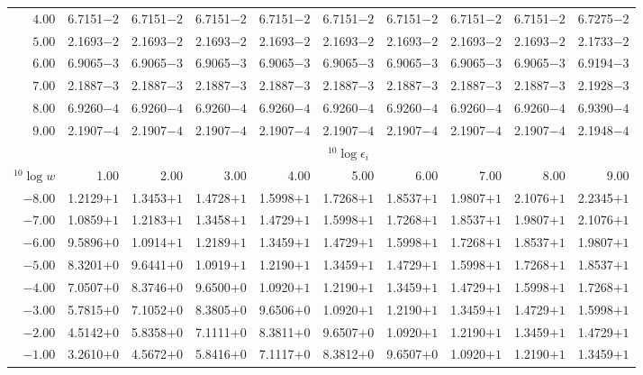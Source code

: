 \documentclass[useAMS,usenatbib]{mn2e}
\begin{document}
\begin{table}
\begin{tabular}{rrrrrrrrrr}
$ 4.00$ & 6.7151$-2$ & 6.7151$-2$ & 6.7151$-2$ & 6.7151$-2$ & 6.7151$-2$ & 6.7151$-2$ & 6.7151$-2$ & 6.7151$-2$ & 6.7275$-2$ \\
$ 5.00$ & 2.1693$-2$ & 2.1693$-2$ & 2.1693$-2$ & 2.1693$-2$ & 2.1693$-2$ & 2.1693$-2$ & 2.1693$-2$ & 2.1693$-2$ & 2.1733$-2$ \\
$ 6.00$ & 6.9065$-3$ & 6.9065$-3$ & 6.9065$-3$ & 6.9065$-3$ & 6.9065$-3$ & 6.9065$-3$ & 6.9065$-3$ & 6.9065$-3$ & 6.9194$-3$ \\
$ 7.00$ & 2.1887$-3$ & 2.1887$-3$ & 2.1887$-3$ & 2.1887$-3$ & 2.1887$-3$ & 2.1887$-3$ & 2.1887$-3$ & 2.1887$-3$ & 2.1928$-3$ \\
$ 8.00$ & 6.9260$-4$ & 6.9260$-4$ & 6.9260$-4$ & 6.9260$-4$ & 6.9260$-4$ & 6.9260$-4$ & 6.9260$-4$ & 6.9260$-4$ & 6.9390$-4$ \\
$ 9.00$ & 2.1907$-4$ & 2.1907$-4$ & 2.1907$-4$ & 2.1907$-4$ & 2.1907$-4$ & 2.1907$-4$ & 2.1907$-4$ & 2.1907$-4$ & 2.1948$-4$ \\
\hline
   & \multicolumn{9}{c}{${}^{10}\log \epsilon_i$} \\
${}^{10}\log w$ & 1.00 &      2.00 &       3.00 &       4.00 &       5.00 &       6.00 &       7.00 &       8.00 &       9.00 \\
\hline
$-8.00$ & 1.2129$+1$ & 1.3453$+1$ & 1.4728$+1$ & 1.5998$+1$ & 1.7268$+1$ & 1.8537$+1$ & 1.9807$+1$ & 2.1076$+1$ & 2.2345$+1$ \\
$-7.00$ & 1.0859$+1$ & 1.2183$+1$ & 1.3458$+1$ & 1.4729$+1$ & 1.5998$+1$ & 1.7268$+1$ & 1.8537$+1$ & 1.9807$+1$ & 2.1076$+1$ \\
$-6.00$ & 9.5896$+0$ & 1.0914$+1$ & 1.2189$+1$ & 1.3459$+1$ & 1.4729$+1$ & 1.5998$+1$ & 1.7268$+1$ & 1.8537$+1$ & 1.9807$+1$ \\
$-5.00$ & 8.3201$+0$ & 9.6441$+0$ & 1.0919$+1$ & 1.2190$+1$ & 1.3459$+1$ & 1.4729$+1$ & 1.5998$+1$ & 1.7268$+1$ & 1.8537$+1$ \\
$-4.00$ & 7.0507$+0$ & 8.3746$+0$ & 9.6500$+0$ & 1.0920$+1$ & 1.2190$+1$ & 1.3459$+1$ & 1.4729$+1$ & 1.5998$+1$ & 1.7268$+1$ \\
$-3.00$ & 5.7815$+0$ & 7.1052$+0$ & 8.3805$+0$ & 9.6506$+0$ & 1.0920$+1$ & 1.2190$+1$ & 1.3459$+1$ & 1.4729$+1$ & 1.5998$+1$ \\
$-2.00$ & 4.5142$+0$ & 5.8358$+0$ & 7.1111$+0$ & 8.3811$+0$ & 9.6507$+0$ & 1.0920$+1$ & 1.2190$+1$ & 1.3459$+1$ & 1.4729$+1$ \\
$-1.00$ & 3.2610$+0$ & 4.5672$+0$ & 5.8416$+0$ & 7.1117$+0$ & 8.3812$+0$ & 9.6507$+0$ & 1.0920$+1$ & 1.2190$+1$ & 1.3459$+1$ \\

\end{tabular}
\end{table}
\end{document}
